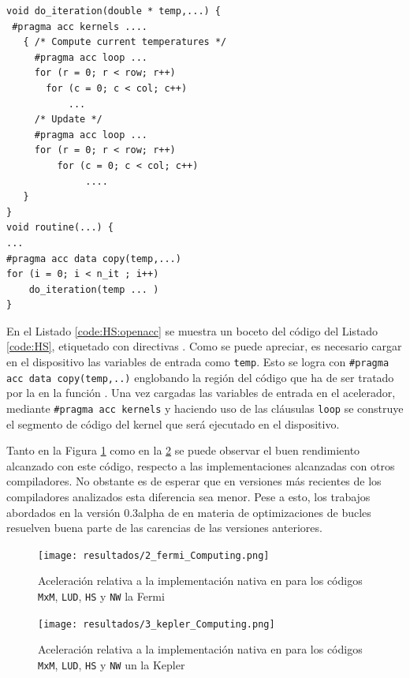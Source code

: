 \begin{lstlisting}[caption={Boceto de \texttt{HS} usando \OpenACC{}},label=code:HS:openacc]
void do_iteration(double * temp,...) {
 #pragma acc kernels ....
   { /* Compute current temperatures */
     #pragma acc loop ... 
     for (r = 0; r < row; r++) 
       for (c = 0; c < col; c++) 
           ...
     /* Update */
     #pragma acc loop ...
     for (r = 0; r < row; r++) 
         for (c = 0; c < col; c++) 
              ....
   }
}
void routine(...) {
...
#pragma acc data copy(temp,...)
for (i = 0; i < n_it ; i++)
    do_iteration(temp ... )
}
\end{lstlisting}

En el Listado \ref{code:HS:openacc} se muestra un boceto del código del Listado 
\ref{code:HS}, etiquetado con directivas \OpenACC{}. Como se puede apreciar,
es necesario cargar en el dispositivo las variables de entrada como \texttt{temp}. Esto
se logra con \texttt{\#pragma acc data copy(temp,..)} englobando la región del
código que ha de ser tratado por la \gpu{} en la función . Una vez 
cargadas las variables de entrada en el acelerador, mediante \texttt{\#pragma acc kernels} 
y haciendo uso de las cláusulas \texttt{loop} se construye el segmento de código del 
kernel que será ejecutado en el dispositivo. 

Tanto en la Figura \ref{fig:allfermi} como en la \ref{fig:allkepler} se puede observar el buen 
rendimiento alcanzado
con este código, respecto a las implementaciones alcanzadas con otros compiladores. No 
obstante es de esperar que en versiones más recientes de los compiladores analizados 
esta diferencia sea menor. Pese a esto, los trabajos abordados en la versión 0.3alpha de 
\accULL{} en materia de optimizaciones de bucles resuelven buena parte de las carencias de 
las versiones anteriores.

\begin{figure}[t]
\centering
\texttt{[image: resultados/2\_fermi\_Computing.png]}
\caption{Aceleración relativa a la implementación nativa en \CUDA{} para los códigos \texttt{MxM}, \texttt{LUD}, \texttt{HS} y \texttt{NW} la \GPU{} Fermi}
\label{fig:allfermi}
\end{figure}


\begin{figure}[t]
\centering
\texttt{[image: resultados/3\_kepler\_Computing.png]}
\caption{Aceleración relativa a la implementación nativa en \CUDA{} para los códigos \texttt{MxM}, \texttt{LUD}, \texttt{HS} y \texttt{NW} un la \GPU{} Kepler}
\label{fig:allkepler}
\end{figure}

